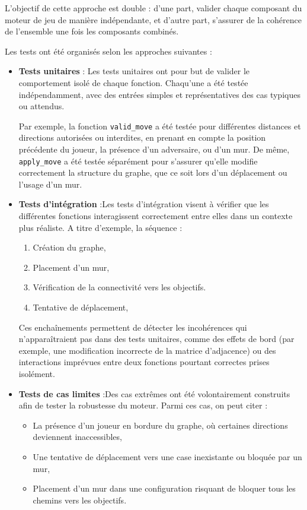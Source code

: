 L’objectif de cette approche est double : d’une part, valider chaque composant du moteur de jeu de manière indépendante, et d’autre part, s’assurer de la cohérence de l’ensemble une fois les composants combinés.

Les tests ont été organisés selon les approches suivantes :
\begin{itemize}
    \item \textbf{Tests unitaires} : Les tests unitaires ont pour but de valider le comportement isolé de chaque fonction. Chaqu'une a été testée indépendamment, avec des entrées simples et représentatives des cas typiques ou attendus.

Par exemple, la fonction \texttt{valid\_move} a été testée pour différentes distances et directions autorisées ou interdites, en prenant en compte la position précédente du joueur, la présence d’un adversaire, ou d’un mur. De même, \texttt{apply\_move} a été testée séparément pour s’assurer qu’elle modifie correctement la structure du graphe, que ce soit lors d’un déplacement ou l'usage d’un mur.

    
    \item \textbf{Tests d’intégration} :Les tests d’intégration visent à vérifier que les différentes fonctions interagissent correctement entre elles dans un contexte plus réaliste.
    A titre d'exemple, la séquence :
\begin{enumerate}
    \item Création du graphe,
    \item Placement d’un mur,
    \item Vérification de la connectivité vers les objectifs.
    \item Tentative de déplacement,
\end{enumerate}
Ces enchaînements permettent de détecter les incohérences qui n’apparaîtraient pas dans des tests unitaires, comme des effets de bord (par exemple, une modification incorrecte de la matrice d’adjacence) ou des interactions imprévues entre deux fonctions pourtant correctes prises isolément.
    
    \item \textbf{Tests de cas limites} :Des cas extrêmes ont été volontairement construits afin de tester la robustesse du moteur. Parmi ces cas, on peut citer :
\begin{itemize}
    \item La présence d’un joueur en bordure du graphe, où certaines directions deviennent inaccessibles,
    \item Une tentative de déplacement vers une case inexistante ou bloquée par un mur,
    \item Placement d’un mur dans une configuration risquant de bloquer tous les chemins vers les objectifs. 
\end{itemize}


\end{itemize}
